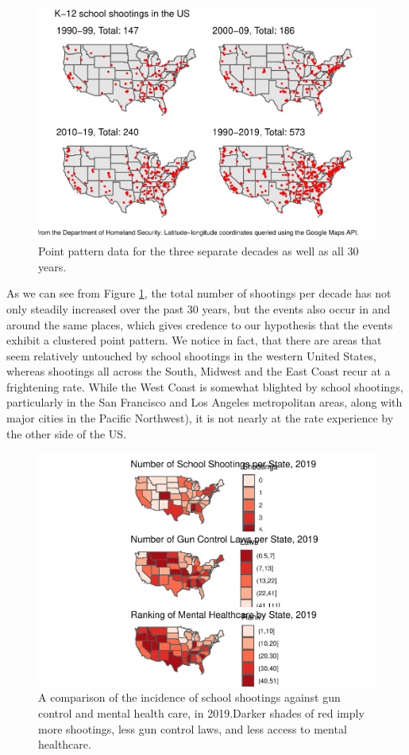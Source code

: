 \documentclass[12pt]{article}
\begin{document}
\begin{figure}
\includegraphics[width=0.65\linewidth,style="float:right; padding:10px]{JStevenRaquel_STATS295_Final_files/figure-latex/plots-all-four-1} \caption{Point pattern data for the three separate decades as well as all 30 years.}\label{fig:plots-all-four}
\end{figure}

As we can see from Figure \ref{fig:plots-all-four}, the total number of shootings per decade has not only steadily increased over the past 30 years, but the events also occur in and around the same places, which gives credence to our hypothesis that the events exhibit a clustered point pattern. We notice in fact, that there are areas that seem relatively untouched by school shootings in the western United States, whereas shootings all across the South, Midwest and the East Coast recur at a frightening rate. While the West Coast is somewhat blighted by school shootings, particularly in the San Francisco and Los Angeles metropolitan areas, along with major cities in the Pacific Northwest), it is not nearly at the rate experience by the other side of the US.

\begin{figure}
\includegraphics[width=0.65\linewidth,style="float:right; padding:10px]{JStevenRaquel_STATS295_Final_files/figure-latex/plot-areals-2019-1} \caption{A comparison of the incidence of school shootings against gun control and mental health care, in 2019.Darker shades of red imply more shootings, less gun control laws, and less access to mental healthcare.}\label{fig:plot-areals-2019}
\end{figure}
\end{document}
